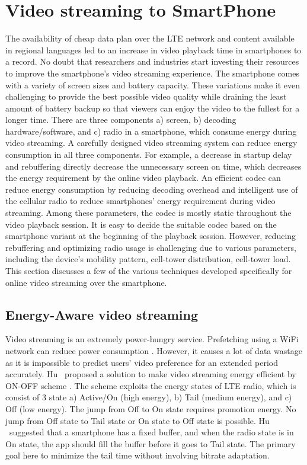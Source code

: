 \section{Video streaming to SmartPhone}
The availability of cheap data plan over the LTE network and content available in regional languages led to an increase in video playback time in smartphones to a record. No doubt that researchers and industries start investing their resources to improve the smartphone's video streaming experience. The smartphone comes with a variety of screen sizes and battery capacity. These variations make it even challenging to provide the best possible video quality while draining the least amount of battery backup so that viewers can enjoy the video to the fullest for a longer time. There are three components a) screen, b) decoding hardware/software, and c) radio in a smartphone, which consume energy during video streaming. A carefully designed video streaming system can reduce energy consumption in all three components. For example, a decrease in startup delay and rebuffering directly decrease the unnecessary screen on time, which decreases the energy requirement by the online video playback. An efficient codec can reduce energy consumption by reducing decoding overhead and intelligent use of the cellular radio to reduce smartphones' energy requirement during video streaming. Among these parameters, the codec is mostly static throughout the video playback session. It is easy to decide the suitable codec based on the smartphone variant at the beginning of the playback session. However, reducing rebuffering and optimizing radio usage is challenging due to various parameters, including the device's mobility pattern, cell-tower distribution, cell-tower load. This section discusses a few of the various techniques developed specifically for online video streaming over the smartphone.

\subsection{Energy-Aware video streaming}
Video streaming is an extremely power-hungry service. Prefetching using a WiFi network can reduce power consumption \cite{6681586,10.1145/2079296.2079321}. However, it causes a lot of data wastage as it is impossible to predict users' video preference for an extended period accurately. Hu \etal\ proposed a solution to make video streaming energy efficient by ON-OFF scheme \cite{7218493}. The scheme exploits the energy states of LTE radio, which is consist of 3 state a) Active/On (high energy), b) Tail (medium energy), and c) Off (low energy). The jump from Off to On state requires promotion energy. No jump from Off state to Tail state or On state to Off state is possible. Hu \etal\ suggested that a smartphone has a fixed buffer, and when the radio state is in On state, the app should fill the buffer before it goes to Tail state. The primary goal here to minimize the tail time without involving bitrate adaptation.

